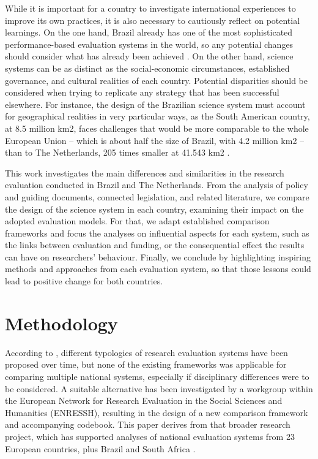 While it is important for a country to investigate international experiences to improve its own practices, it is also necessary to cautiously reflect on potential learnings. On the one hand, Brazil already has one of the most sophisticated performance-based evaluation systems in the world, so any potential changes should consider what has already been achieved \autocite[5]{Faljoni-Alario.2018}. On the other hand, science systems can be as distinct as the social-economic circumstances, established governance, and cultural realities of each country. Potential disparities should be considered when trying to replicate any strategy that has been successful elsewhere. For instance, the design of the Brazilian science system must account for geographical realities in very particular ways, as the South American country, at 8.5 million km2, faces challenges that would be more comparable to the whole European Union – which is about half the size of Brazil, with 4.2 million km2 – than to The Netherlands, 205 times smaller at 41.543 km2 \autocite{CBS.2021, IBGE.2021}.

This work investigates the main differences and similarities in the research evaluation conducted in Brazil and The Netherlands. From the analysis of policy and guiding documents, connected legislation, and related literature, we compare the design of the science system in each country, examining their impact on the adopted evaluation models. For that, we adapt established comparison frameworks and focus the analyses on influential aspects for each system, such as the links between evaluation and funding, or the consequential effect the results can have on researchers’ behaviour. Finally, we conclude by highlighting inspiring methods and approaches from each evaluation system, so that those lessons could lead to positive change for both countries. 

\section{Methodology}
\label{sec:comp_evaluation:method}

According to \textcite{Galleron.2017}, different typologies of research evaluation systems have been proposed over time, but none of the existing frameworks was applicable for comparing multiple national systems, especially if disciplinary differences were to be considered. A suitable alternative has been investigated by a workgroup within the European Network for Research Evaluation in the Social Sciences and Humanities (ENRESSH), resulting in the design of a new comparison framework and accompanying codebook. This paper derives from that broader research project, which has supported analyses of national evaluation systems from 23 European countries, plus Brazil and South Africa \autocite{Ochsner.2020}.


